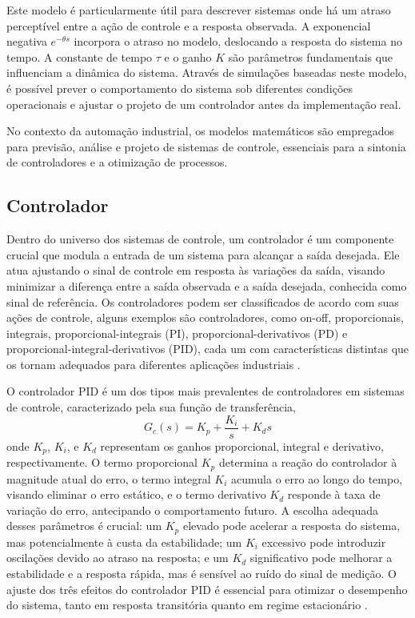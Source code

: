 Este modelo é particularmente útil para descrever sistemas onde há um atraso perceptível entre a ação de controle e a
resposta observada.
A exponencial negativa \( e^{-\theta s} \) incorpora o atraso no modelo, deslocando a resposta do sistema no tempo.
A constante de tempo \( \tau \) e o ganho \( K \) são parâmetros fundamentais que influenciam a dinâmica do sistema.
Através de simulações baseadas neste modelo, é possível prever o comportamento do sistema sob diferentes
condições operacionais e ajustar o projeto de um controlador antes da implementação real.

No contexto da automação industrial, os modelos matemáticos são empregados para previsão, análise e projeto de sistemas
de controle, essenciais para a sintonia de controladores e a otimização de processos.

\subsection{Controlador}

Dentro do universo dos sistemas de controle, um controlador é um componente crucial que modula a entrada de um sistema
para alcançar a saída desejada.
Ele atua ajustando o sinal de controle em resposta às variações da saída, visando minimizar a diferença entre a saída
observada e a saída desejada, conhecida como sinal de referência.
Os controladores podem ser classificados de acordo com suas ações de controle, alguns exemplos são controladores,
como on-off, proporcionais, integrais, proporcional-integrais (PI), proporcional-derivativos (PD) e
proporcional-integral-derivativos (PID), cada um com características distintas que os tornam adequados para diferentes
aplicações industriais \cite{ogata2010engenharia}.

O controlador PID é um dos tipos mais prevalentes de controladores em sistemas de controle, caracterizado pela sua
função de transferência,
\begin{equation}
    \label{eq:ctrlr}
    G_c(s) = K_p + \frac{K_i}{s} + K_d s
\end{equation}
onde \( K_p \), \( K_i \), e \( K_d \) representam os ganhos proporcional, integral e derivativo, respectivamente.
O termo proporcional \( K_p \) determina a reação do controlador à magnitude atual do erro,
o termo integral \( K_i \) acumula o erro ao longo do tempo, visando eliminar o erro estático,
e o termo derivativo \( K_d \) responde à taxa de variação do erro, antecipando o comportamento futuro.
A escolha adequada desses parâmetros é crucial: um \( K_p \) elevado pode acelerar a resposta do sistema, mas
potencialmente à custa da estabilidade;
um \( K_i \) excessivo pode introduzir oscilações devido ao atraso na resposta;
e um \( K_d \) significativo pode melhorar a estabilidade e a resposta rápida, mas é sensível ao ruído do sinal de
medição.
O ajuste dos três efeitos do controlador PID é essencial para otimizar o desempenho do sistema, tanto em resposta
transitória quanto em regime estacionário \cite{ogata2010engenharia}.

